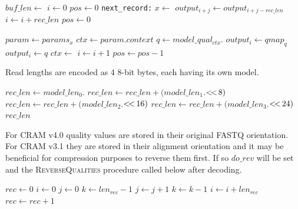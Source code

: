 \documentclass[a4paper]{article}
\begin{document}
\begin{algorithmic}[1]
  \State $buf\_len \gets$ 
  \State {}
  \State {}
  \State $i \gets 0$
  \State $pos \gets 0$
  \Label \texttt{next\_record:}
      \State $x \gets $
          \State $output_{i+j} \gets output_{i+j-rec\_len}$
        \EndFor
        \State $i \gets i+rec\_len$
        \State $pos \gets 0$
        \State {}
      \EndIf

      \Statex
      \State $param \gets params_x$
      \State $ctx \gets param.context$
    \EndIf
    \Statex
    \State $q \gets model\_qual_{ctx}.$
      \State $output_i \gets qmap_q$
    \Else
      \State $output_i \gets q$
    \EndIf
    \Statex
    \State $ctx \gets $
    \Statex
    \State $i \gets i + 1$
    \State $pos \gets pos - 1$
  \EndWhile
    \State {}
  \EndIf
\EndProcedure
\end{algorithmic}

Read lengths are encoded as 4 8-bit bytes, each having its own model.

\begin{algorithmic}[1]
\State $rec\_len \gets model\_len_0.$
\State $rec\_len \gets rec\_len + (model\_len_1.$$ \mathbin{<\mkern-3mu<\,} 8)$
\State $rec\_len \gets rec\_len + (model\_len_2.$$ \mathbin{<\mkern-3mu<\,} 16)$
\State $rec\_len \gets rec\_len + (model\_len_3.$$ \mathbin{<\mkern-3mu<\,} 24)$
\State \Return $rec\_len$
\EndFunction
\end{algorithmic}

For CRAM v4.0 quality values are stored in their original FASTQ
orientation.  For CRAM v3.1 they are stored in their alignment
orientation and it may be beneficial for compression purposes to
reverse them first.  If so $do\_rev$ will be set and the
\textsc{ReverseQualities} procedure called below after decoding.

\begin{algorithmic}[1]
\State $rec \gets 0$
\State $i \gets 0$
    \State $j \gets 0$
    \State $k \gets len_{rec}-1$
      \State {}
      \State $j \gets j+1$
      \State $k \gets k-1$
    \EndWhile
    \State $i \gets i + len_{rec}$
    \State $rec \gets rec+1$
  \EndIf
\EndWhile
\EndProcedure
\end{algorithmic}
\end{document}
